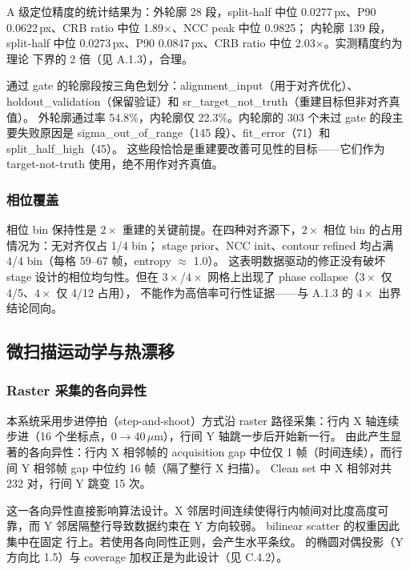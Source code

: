 A 级定位精度的统计结果为：外轮廓 28 段，split-half 中位 0.0277\,px、P90 0.0622\,px、CRB ratio 中位 1.89\(\times\)、NCC peak 中位 0.9825；
内轮廓 139 段，split-half 中位 0.0273\,px、P90 0.0847\,px、CRB ratio 中位 2.03\(\times\)。实测精度约为理论  下界的 2 倍（见 A.1.3），合理。

通过 gate 的轮廓段按三角色划分：alignment\_input（用于对齐优化）、holdout\_validation（保留验证）和 sr\_target\_not\_truth（重建目标但非对齐真值）。
外轮廓通过率 54.8\%，内轮廓仅 22.3\%。内轮廓的 303 个未过 gate 的段主要失败原因是 sigma\_out\_of\_range（145 段）、fit\_error（71）和 split\_half\_high（45）。
这些段恰恰是重建要改善可见性的目标——它们作为 target-not-truth 使用，绝不用作对齐真值。

\subsubsection{相位覆盖}

相位 bin 保持性是 \(2\times\) 重建的关键前提。在四种对齐源下，\(2\times\) 相位 bin 的占用情况为：无对齐仅占 1/4 bin；
stage prior、NCC init、contour refined 均占满 4/4 bin（每格 59--67 帧，entropy \(\approx\) 1.0）。
这表明数据驱动的修正没有破坏 stage 设计的相位均匀性。但在 \(3\times\)/\(4\times\) 网格上出现了 phase collapse（\(3\times\) 仅 4/5、\(4\times\) 仅 4/12 占用），
不能作为高倍率可行性证据——与 A.1.3 的 \(4\times\) 出界结论同向。

\subsection{微扫描运动学与热漂移}

\subsubsection{Raster 采集的各向异性}

本系统采用步进停拍（step-and-shoot）方式沿 raster 路径采集：行内 X 轴连续步进（16 个坐标点，\(0 \to 40\)\,\(\mu\)m），行间 Y 轴跳一步后开始新一行。
由此产生显著的各向异性：行内 X 相邻帧的 acquisition gap 中位仅 1 帧（时间连续），而行间 Y 相邻帧 gap 中位约 16 帧（隔了整行 X 扫描）。
Clean set 中 X 相邻对共 232 对，行间 Y 跳变 15 次。

这一各向异性直接影响算法设计。X 邻居时间连续使得行内帧间对比度高度可靠，而 Y 邻居隔整行导致数据约束在 Y 方向较弱。
bilinear scatter 的权重因此集中在固定  行上。若使用各向同性正则，会产生水平条纹。
 的椭圆对偶投影（Y 方向比 1.5）与 coverage 加权正是为此设计（见 C.4.2）。

